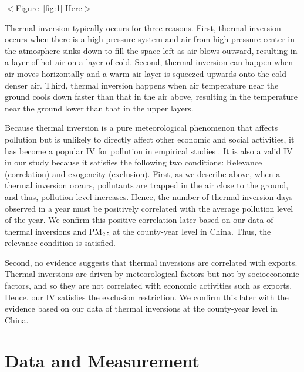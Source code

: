 \documentclass[12pt]{article}
\begin{document}
\begin{center}
$<$Figure~\ref{fig:1} Here$>$ 
\end{center}

Thermal inversion typically occurs for three reasons. First, thermal inversion
occurs when there is a high pressure system and air from high pressure
center in the atmosphere sinks down to fill the space left as air blows
outward, resulting in a layer of hot air on a layer of cold. Second, thermal
inversion can happen when air moves horizontally and a warm air layer is
squeezed upwards onto the cold denser air. Third, thermal inversion
happens when air temperature near the ground cools down faster than that in
the air above, resulting in the temperature near the ground lower than that
in the upper layers. 

Because thermal inversion is a pure meteorological phenomenon that affects
pollution but is unlikely to directly affect other economic and social
activities, it has become a popular IV for pollution in
empirical studies %
\citep{arceo2016does,jans2018economic,sager2019estimating,chen2022effect,NBERw28401}%
. It is also a valid IV in our study because it satisfies
the following two conditions: Relevance (correlation) and exogeneity (exclusion). First,
as we describe above, when a thermal inversion occurs, pollutants are
trapped in the air close to the ground, and thus, pollution level increases.
Hence, the number of thermal-inversion days observed in a year must be positively
correlated with the average pollution level of the year. We confirm this positive correlation later based on our data of thermal inversions and $\mathrm{PM_{2.5}}$ at the county-year level in China. Thus, the relevance condition is satisfied.

  Second, no evidence suggests that thermal inversions are correlated with
  exports. Thermal inversions are driven by meteorological factors but not by
  socioeconomic factors, and so they are not correlated with economic activities
  such as exports. Hence, our IV satisfies the exclusion restriction. We confirm this later with the evidence based on our data of
  thermal inversions at the county-year level in China. 
  
  \section{Data and Measurement}

  \label{sec:3}
  
\end{document}
